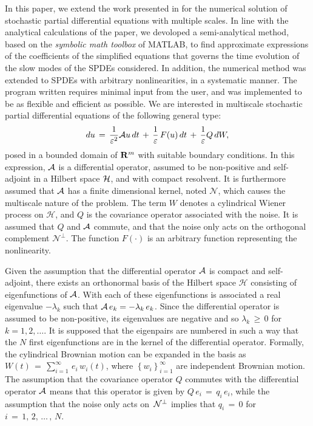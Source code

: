 In this paper, we extend the work presented in \cite{abdulle2012numerical} for
the numerical solution of stochastic partial differential equations with
multiple scales. In line with the analytical calculations of the paper, we
devoloped a semi-analytical method, based on the \emph{symbolic math toolbox}
of MATLAB, to find approximate expressions of the coefficients of the
simplified equations that governs the time evolution of the slow modes of the
SPDEs considered. In addition, the numerical method was extended to SPDEs with
arbitrary nonlinearities, in a systematic manner. The program written requires
minimal input from the user, and was implemented to be as flexible and
efficient as possible. We are interested in multiscale stochastic partial
differential equations of the following general type:
\begin{equation*}
    du\,=\, \frac{1}{{\varepsilon}^2}  \mathcal A u \,dt \,+\, \frac 1
    {\varepsilon} \, F(u) \, dt\, + \,\frac{1}{\varepsilon}  Q\,dW, 
    \label{eq: basis spde} 
\end{equation*}
posed in a bounded domain of $\mathbf R^m$ with suitable boundary conditions.
In this expression, $\mathcal A$ is a differential operator, assumed to be
non-positive and self-adjoint in a Hilbert space $\mathcal H$, and with compact
resolvent. It is furthermore assumed that $\mathcal A$ has a finite dimensional
kernel, noted $\mathcal N$, which causes the multiscale nature of the problem.
The term $W$ denotes a cylindrical Wiener process on $\mathcal H$, and $Q$ is
the covariance operator associated with the noise. It is assumed that $Q$ and
$\mathcal A$ commute, and that the noise only acts on the orthogonal complement
$\mathcal N^{\perp}$.  The function $F({\cdot})$ is an arbitrary function
representing the nonlinearity. 

Given the assumption that the differential operator $\mathcal A$ is compact and
self-adjoint, there exists an orthonormal basis of the Hilbert space $\mathcal
H$ consisting of eigenfunctions of $\mathcal A$. With each of these
eigenfunctions is associated a real eigenvalue $-{\lambda}_k$ such that
$\mathcal A\,e_{k} = -{\lambda}_{k}\,e_{k}$. Since the differential operator is
assumed to be non-positive, its eigenvalues are negative and so
${\lambda}_k\,\geq\,0$ for $k= 1, 2,{\dots}$.  It is supposed that the
eigenpairs are numbered in such a way that the $N$ first eigenfunctions are in
the kernel of the differential operator. Formally, the cylindrical Brownian
motion can be expanded in the basis as $W(t) \,=\, \sum^{\infty}_{i=1} \, e_i
\, w_i(t)$, where $\left\{w_i\right\}_{i=1}^{\infty}$ are independent Brownian
motion. The assumption that the covariance operator $Q$ commutes with the
differential operator $\mathcal A$ means that this operator is given by $Q\,e_i
\,=\, q_i\, e_i$, while the assumption that the noise only acts on \,$\mathcal
N^{\perp}$ implies that $q_i \,=\, 0$ for $i\,=\,1,\,2,\,{\dots}\, , \, N$.

